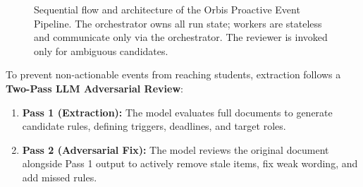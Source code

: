 \documentclass[a4paper,12pt]{article}
\begin{document}
\begin{figure}[H]
{}
    \caption[Proactive Event Pipeline Architecture]{Sequential flow and architecture of the Orbis Proactive Event Pipeline. The orchestrator owns all run state; workers are stateless and communicate only via the orchestrator. The reviewer is invoked only for ambiguous candidates.}
    \label{fig:event_system_architecture}
\end{figure}

To prevent non-actionable events from reaching students, extraction follows a \textbf{Two-Pass LLM Adversarial Review}:
\begin{enumerate}
    \item \textbf{Pass 1 (Extraction):} The model evaluates full documents to generate candidate rules, defining triggers, deadlines, and target roles.
    \item \textbf{Pass 2 (Adversarial Fix):} The model reviews the original document alongside Pass 1 output to actively remove stale items, fix weak wording, and add missed rules.
\end{enumerate}
\end{document}
